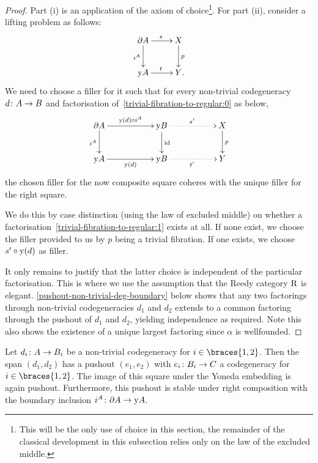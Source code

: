 \documentclass[reqno,10pt,a4paper,oneside]{amsart}
\begin{document}
\begin{proof} Part (i) is an application of the axiom of choice\footnote{This will be the only use of choice in this section, the remainder of the classical development in this subsection relies only on the law of the excluded middle.}.
For part (ii), consider a lifting problem as follows:
\begin{equation} \label{trivial-fibration-to-regular:0}
\xymatrix{
  \partial A
  \ar[d]_{i^A}
  \ar[r]^{s}
&
  X
  \ar[d]^{p}
\\
  \yon A
  \ar[r]^{t}
&
  Y \rlap{.}
}
\end{equation}
We need to choose a filler for it such that for every non-trivial codegeneracy $d \colon A \to B$ and factorisation of~\eqref{trivial-fibration-to-regular:0} as below,
\begin{equation} \label{trivial-fibration-to-regular:1}
\xymatrix@C+3em{
  \partial A
  \ar[r]^{\yon(d) \cc i^A}
  \ar[d]_{i^A}
&
  \yon B
  \ar@{.>}[r]^{s'}
  \ar[d]^{\id}
&
  X
  \ar[d]^{p}
\\
  \yon A
  \ar[r]_{\yon(d)}
&
  \yon B
  \ar@{.>}[r]_{t'}
&
  Y
}
\end{equation}
the chosen filler for the now composite square coheres with the unique filler for the right square.

We do this by case distinction (using the law of excluded middle) on whether a factorisation~\eqref{trivial-fibration-to-regular:1} exists at all.
If none exist, we choose the filler provided to us by $p$ being a trivial fibration.
If one exists, we choose $s' \mathbin{\circ} \mathrm{y}(d)$ as filler.

It only remains to justify that the latter choice is independent of the particular factorisation.
This is where we use the assumption that the Reedy category $\mathrm{R}$ is elegant.
\cref{pushout-non-trivial-deg-boundary} below shows that any two factorings through non-trivial codegeneracies $d_1$ and $d_2$ extends to a common factoring through the pushout of $d_1$ and $d_2$, yielding independence as required.
Note this also shows the existence of a unique largest factoring since $\alpha$ is wellfounded.
\end{proof}

\begin{lemma}
\label{pushout-non-trivial-deg-boundary}
Let $d_i \colon A \to B_i$ be a non-trivial codegeneracy for $i \in \braces{1, 2}$.
Then the span $(d_1, d_2)$ has a pushout $(e_1, e_2)$ with $e_i \colon B_i \to C$ a codegeneracy for $i \in \braces{1, 2}$.
The image of this square under the Yoneda embedding is again pushout.
Furthermore, this pushout is stable under right composition with the boundary inclusion $i^A \colon \partial A \to \mathrm{y} A$.
\end{lemma}
\end{document}
